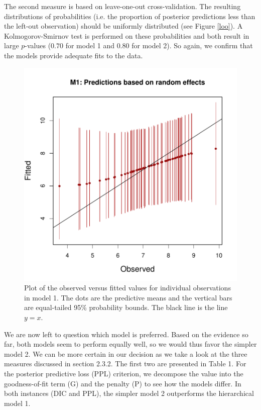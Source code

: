 \documentclass{asaproc}
\begin{document}
The second measure is based on leave-one-out cross-validation. The resulting distributions of probabilities (i.e. the proportion of posterior predictions less than the left-out observation) should be uniformly distributed (see Figure \ref{loo}). A Kolmogorov-Smirnov test is performed on these probabilities and both result in large $p$-values ($0.70$ for model 1 and $0.80$ for model 2). So again, we confirm that the models provide adequate fits to the data.

\begin{figure}
\centering
\includegraphics[scale=0.50]{figs/m1_obs_fit.pdf}
\caption{Plot of the observed versus fitted values for individual observations in model 1. The dots are the predictive means and the vertical bars are equal-tailed 95\% probability bounds. The black line is the line $y=x$.}
\label{obs_fit}
\end{figure}

We are now left to question which model is preferred. Based on the evidence so far, both models seem to perform equally well, so we would thus favor the simpler model 2. We can be more certain in our decision as we take a look at the three measures discussed in section 2.3.2. The first two are presented in Table 1. For the posterior predictive loss (PPL) criterion, we decompose the value into the goodness-of-fit term (G) and the penalty (P) to see how the models differ. In both instances (DIC and PPL), the simpler model 2 outperforms the hierarchical model 1.
\end{document}
